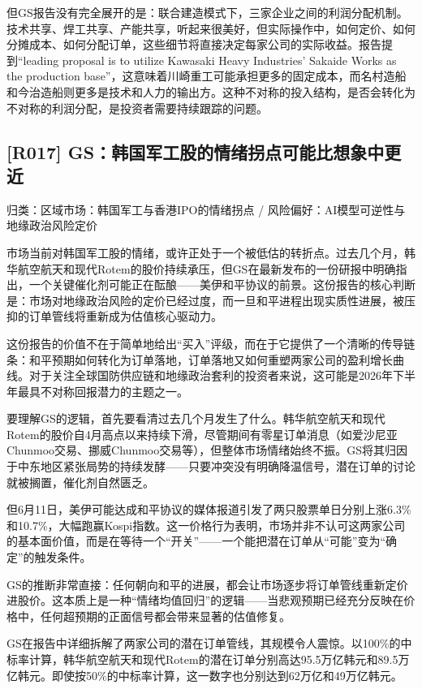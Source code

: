 \documentclass[11pt]{ctexart}
\begin{document}
但GS报告没有完全展开的是：联合建造模式下，三家企业之间的利润分配机制。技术共享、焊工共享、产能共享，听起来很美好，但实际操作中，如何定价、如何分摊成本、如何分配订单，这些细节将直接决定每家公司的实际收益。报告提到“leading proposal is to utilize Kawasaki Heavy Industries' Sakaide Works as the production base”，这意味着川崎重工可能承担更多的固定成本，而名村造船和今治造船则更多是技术和人力的输出方。这种不对称的投入结构，是否会转化为不对称的利润分配，是投资者需要持续跟踪的问题。

\subsection{[R017] GS：韩国军工股的情绪拐点可能比想象中更近}
{\small\color{refgray}归类：区域市场：韩国军工与香港IPO的情绪拐点 / 风险偏好：AI模型可逆性与地缘政治风险定价}

市场当前对韩国军工股的情绪，或许正处于一个被低估的转折点。过去几个月，韩华航空航天和现代Rotem的股价持续承压，但GS在最新发布的一份研报中明确指出，一个关键催化剂可能正在酝酿——美伊和平协议的前景。这份报告的核心判断是：市场对地缘政治风险的定价已经过度，而一旦和平进程出现实质性进展，被压抑的订单管线将重新成为估值核心驱动力。

这份报告的价值不在于简单地给出“买入”评级，而在于它提供了一个清晰的传导链条：和平预期如何转化为订单落地，订单落地又如何重塑两家公司的盈利增长曲线。对于关注全球国防供应链和地缘政治套利的投资者来说，这可能是2026年下半年最具不对称回报潜力的主题之一。

要理解GS的逻辑，首先要看清过去几个月发生了什么。韩华航空航天和现代Rotem的股价自4月高点以来持续下滑，尽管期间有零星订单消息（如爱沙尼亚Chunmoo交易、挪威Chunmoo交易等），但整体市场情绪始终不振。GS将其归因于中东地区紧张局势的持续发酵——只要冲突没有明确降温信号，潜在订单的讨论就被搁置，催化剂自然匮乏。

但6月11日，美伊可能达成和平协议的媒体报道引发了两只股票单日分别上涨6.3\%和10.7\%，大幅跑赢Kospi指数。这一价格行为表明，市场并非不认可这两家公司的基本面价值，而是在等待一个“开关”——一个能把潜在订单从“可能”变为“确定”的触发条件。

GS的推断非常直接：任何朝向和平的进展，都会让市场逐步将订单管线重新定价进股价。这本质上是一种“情绪均值回归”的逻辑——当悲观预期已经充分反映在价格中，任何超预期的正面信号都会带来显著的估值修复。

GS在报告中详细拆解了两家公司的潜在订单管线，其规模令人震惊。以100\%的中标率计算，韩华航空航天和现代Rotem的潜在订单分别高达95.5万亿韩元和89.5万亿韩元。即使按50\%的中标率计算，这一数字也分别达到62万亿和49万亿韩元。
\end{document}
